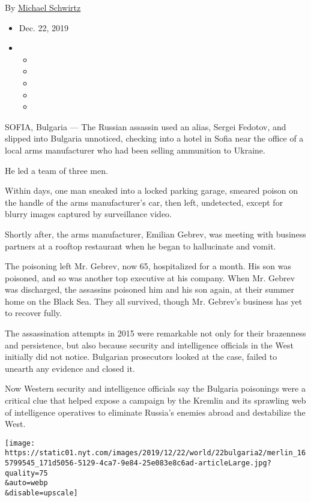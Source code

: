 By \href{https://www.nytimes.com/by/michael-schwirtz}{Michael Schwirtz}

\begin{itemize}
\item
  Dec. 22, 2019
\item
  \begin{itemize}
  \item
  \item
  \item
  \item
  \item
  \end{itemize}
\end{itemize}

SOFIA, Bulgaria --- The Russian assassin used an alias, Sergei Fedotov,
and slipped into Bulgaria unnoticed, checking into a hotel in Sofia near
the office of a local arms manufacturer who had been selling ammunition
to Ukraine.

He led a team of three men.

Within days, one man sneaked into a locked parking garage, smeared
poison on the handle of the arms manufacturer's car, then left,
undetected, except for blurry images captured by surveillance video.

Shortly after, the arms manufacturer, Emilian Gebrev, was meeting with
business partners at a rooftop restaurant when he began to hallucinate
and vomit.

The poisoning left Mr. Gebrev, now 65, hospitalized for a month. His son
was poisoned, and so was another top executive at his company. When Mr.
Gebrev was discharged, the assassins poisoned him and his son again, at
their summer home on the Black Sea. They all survived, though Mr.
Gebrev's business has yet to recover fully.

The assassination attempts in 2015 were remarkable not only for their
brazenness and persistence, but also because security and intelligence
officials in the West initially did not notice. Bulgarian prosecutors
looked at the case, failed to unearth any evidence and closed it.

Now Western security and intelligence officials say the Bulgaria
poisonings were a critical clue that helped expose a campaign by the
Kremlin and its sprawling web of intelligence operatives to eliminate
Russia's enemies abroad and destabilize the West.

\texttt{[image: https://static01.nyt.com/images/2019/12/22/world/22bulgaria2/merlin\_165799545\_171d5056-5129-4ca7-9e84-25e083e8c6ad-articleLarge.jpg?quality=75\\\&auto=webp\\\&disable=upscale]}

